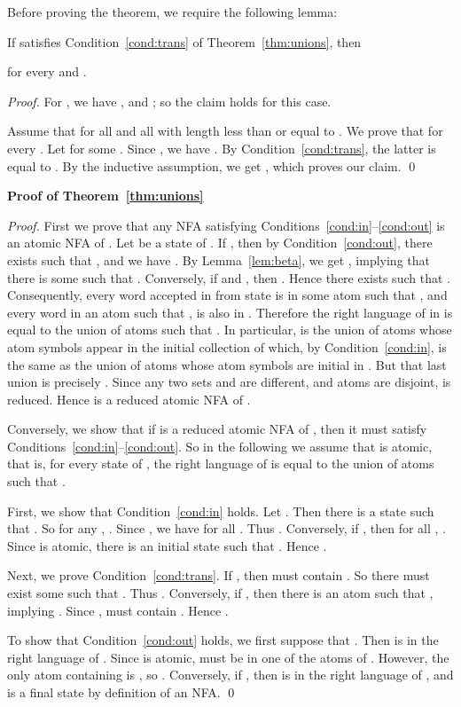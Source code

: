 \documentclass{llncs}
\newcommand{\noin}{\noindent}
\begin{document}
Before proving the theorem, we require the following lemma:

\begin{lemma}
\label{lem:beta}
If  satisfies Condition~\ref{cond:trans} of Theorem~\ref{thm:unions}, then
 
for every  and .
\end{lemma}
\begin{proof}
For , we have , and 
; so the claim holds for this case.

Assume that 
for all  and all  with length less than or 
equal to . 
We prove that  for every .
Let  for
some . 
Since , we have
.
By   Condition~\ref{cond:trans}, the latter is equal 
to .
By the inductive assumption, we get
, which proves our claim.
\qed
\end{proof}
\noin
{\bf Proof of Theorem~\ref{thm:unions}}
\begin{proof}
First we prove that any NFA  satisfying
Conditions~\ref{cond:in}--\ref{cond:out} is an atomic NFA of .
Let  be a state of . 
If , then by 
Condition~\ref{cond:out}, there exists 
 such that , and 
we have . 
By Lemma~\ref{lem:beta}, we get , 
implying that there is some  such that 
. 
Conversely, if  and , then 
. 
Hence there exists  such that . 
Consequently, every word accepted in  from state  is 
in some atom  such that , and 
every word in an atom  such that , is also in 
.
Therefore the right language of  in  is equal to 
the union of atoms  such that .
In particular,  is the union of atoms whose atom symbols
appear in the initial collection of  which, by Condition~\ref{cond:in},  
is the same as the union of atoms whose atom symbols are initial in .
But that last union is precisely .
Since any two sets  and  are different, and  
atoms are disjoint,  is reduced.
Hence  is a reduced atomic NFA of .

Conversely, we show that if  is a reduced atomic NFA of , 
then it must satisfy Conditions~\ref{cond:in}--\ref{cond:out}.
So in the following we assume that  is atomic, that is, 
for every state  of , the right language of  
is equal to the union of atoms  such that .


First, we show that Condition~\ref{cond:in} holds.
Let . Then there is a state  such that 
. So for any , . 
Since , we have  for all .
Thus .
Conversely, if , then for all , . 
Since  is atomic, there is an initial state  such that 
. Hence . 

Next, we prove Condition~\ref{cond:trans}. 
If , then  must contain . 
So there must exist some  such that .
Thus .
Conversely, if , then there is an atom 
 such that , implying .
Since ,  must contain .
Hence .

To show that Condition~\ref{cond:out} holds, we first suppose that
. Then  is in the right language of .
Since  is atomic,  must be in one of the atoms of .
However, the only atom containing  is , so .
Conversely, if , then  is in the right language of  
, and  is a final state by definition of an NFA.
\qed
\end{proof}
\end{document}
